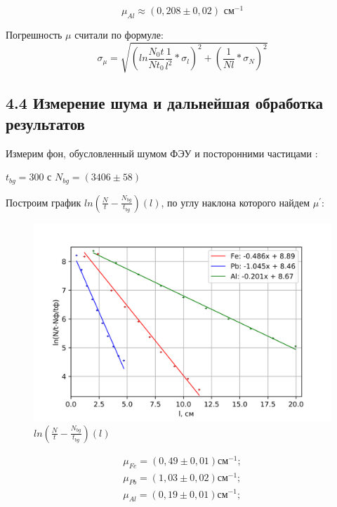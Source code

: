 \documentclass[a4paper,12pt]{report}
\begin{document}
\begin{equation*}
    \mu_{Al} \approx (0,208\pm0,02)\text{ см}^{-1}
\end{equation*}

Погрешность $\mu$ считали по формуле:
\begin{equation*}
    \sigma_{\mu} = \sqrt{(ln\frac{N_{0}t}{Nt_{0}}\frac{1}{l^{2}}*\sigma_{l})^{2} + (\frac{1}{Nl}*\sigma_{N})^2}
\end{equation*}


\subsection*{4.4 Измерение шума и дальнейшая обработка результатов}
Измерим фон, обусловленный шумом ФЭУ и посторонними частицами : 

\begin{center}
   $t_{bg} = 300$ с $N_{bg} = (3406\pm58)$ 
\end{center}


Построим график $ln(\frac{N}{t}-\frac{N_{bg}}{t_{bg}})(l)$, по углу наклона которого найдем $\mu^\prime$:

	\begin{figure}[H]
		\centering
		\includegraphics[width=0.8\linewidth]{find_mu.png}
		\caption{$ln(\frac{N}{t}-\frac{N_{bg}}{t_{bg}})(l)$}
		\label{ris mu}
	\end{figure}

\begin{equation*}
\begin{gathered}
    \mu_{Fe} = (0,49\pm 0,01) \text{см}^{-1}; \\
    \mu_{Pb} = (1,03\pm 0,02) \text{см}^{-1}; \\
    \mu_{Al} = (0,19\pm 0,01) \text{см}^{-1};
\end{gathered}
\end{equation*}
\end{document}
